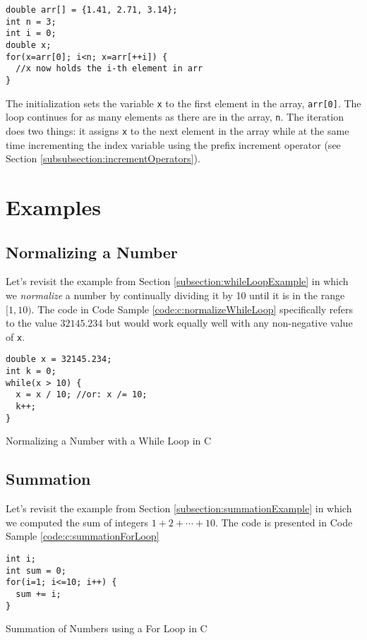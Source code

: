 \begin{verbatim}
double arr[] = {1.41, 2.71, 3.14};
int n = 3;
int i = 0;
double x;
for(x=arr[0]; i<n; x=arr[++i]) {
  //x now holds the i-th element in arr
}
\end{verbatim}

The initialization sets the variable \texttt{x} to the first element in
the array, \texttt{arr[0]}.  The loop continues for as many elements
as there are in the array, \texttt{n}.  The iteration does two things:
it assigns \texttt{x} to the next element in the array while at the
same time incrementing the index variable using the prefix increment 
operator (see Section \ref{subsubsection:incrementOperators}).

\section{Examples}

\subsection{Normalizing a Number}

Let's revisit the example from Section \ref{subsection:whileLoopExample} in 
which we \emph{normalize} a number by continually dividing it by 10 until it
is in the range $[1, 10)$.
The code in Code Sample \ref{code:c:normalizeWhileLoop} specifically
refers to the value $32145.234$ but would work equally well with any 
non-negative value of \texttt{x}.

\begin{listing}[!h]
\begin{verbatim}
double x = 32145.234;
int k = 0;
while(x > 10) {
  x = x / 10; //or: x /= 10;
  k++;
}
\end{verbatim}
  \caption{Normalizing a Number with a While Loop in C}
  \label{code:c:normalizeWhileLoop}
\end{listing}

\subsection{Summation}

Let's revisit the example from Section \ref{subsection:summationExample} in which
we computed the sum of integers $1 + 2 + \cdots + 10$.  The code is presented in
Code Sample \ref{code:c:summationForLoop}

\begin{listing}[!h]
\begin{verbatim}
int i;
int sum = 0;
for(i=1; i<=10; i++) {
  sum += i;
}
\end{verbatim}
  \caption{Summation of Numbers using a For Loop in C}
  \label{code:c:summationForLoop}
\end{listing}

